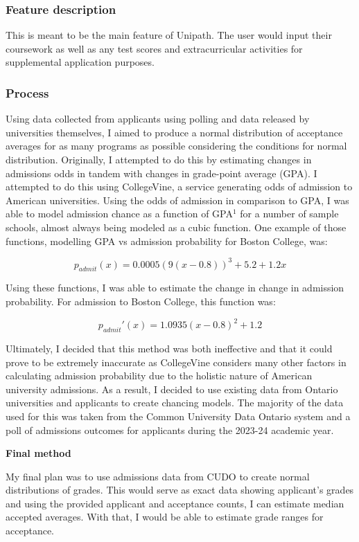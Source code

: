 \documentclass{article}
\begin{document}
    \subsubsection{Feature description}
    This is meant to be the main feature of Unipath. The user would input their coursework as well as any test scores and extracurricular activities for supplemental application purposes.
    \subsubsection{Process}
    Using data collected from applicants using polling and data released by universities themselves, I aimed to produce a normal distribution of acceptance averages for as many programs as possible considering the conditions for normal distribution. Originally, I attempted to do this by estimating changes in admissions odds in tandem with changes in grade-point average (GPA). I attempted to do this using CollegeVine, a service generating odds of admission to American universities. Using the odds of admission in comparison to GPA, I was able to model admission chance as a function of GPA\(^1\) for a number of sample schools, almost always being modeled as a cubic function. One example of those functions, modelling GPA vs admission probability for Boston College, was:

    \[p_{admit}(x) = 0.0005(9(x-0.8))^3 +5.2 + 1.2x\]

    Using these functions, I was able to estimate the change in change in admission probability. For admission to Boston College, this function was:

    \[p_{admit}'(x) = 1.0935(x-0.8)^2 + 1.2\]

    Ultimately, I decided that this method was both ineffective and that it could prove to be extremely inaccurate as CollegeVine considers many other factors in calculating admission probability due to the holistic nature of American university admissions. As a result, I decided to use existing data from Ontario universities and applicants to create chancing models. The majority of the data used for this was taken from the Common University Data Ontario system and a poll of admissions outcomes for applicants during the 2023-24 academic year.

    \textbf{Final method}

    My final plan was to use admissions data from CUDO to create normal distributions of grades. This would serve as exact data showing applicant's grades and using the provided applicant and acceptance counts, I can estimate median accepted averages. With that, I would be able to estimate grade ranges for acceptance.
\end{document}
